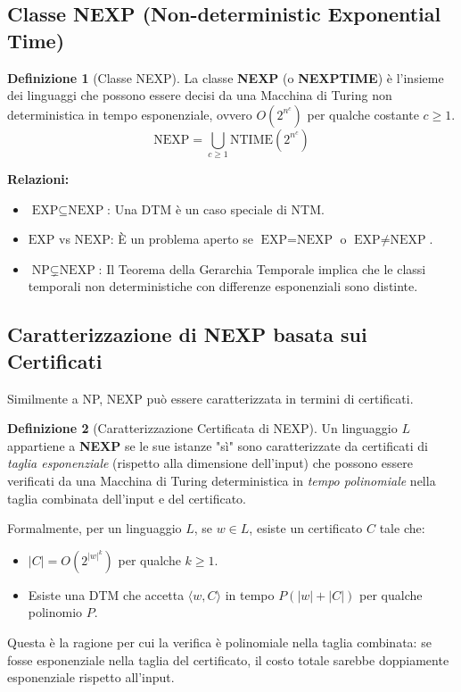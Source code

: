 \documentclass[a4paper]{article}
\theoremstyle{definition} %
\newtheorem{definition}{Definizione}
\begin{document}
\subsection{Classe NEXP (Non-deterministic Exponential Time)}
\begin{definition}[Classe NEXP]
La classe \textbf{NEXP} (o \textbf{NEXPTIME}) è l'insieme dei linguaggi che possono essere decisi da una Macchina di Turing non deterministica in tempo esponenziale, ovvero $O(2^{n^c})$ per qualche costante $c \ge 1$.
\[
\text{NEXP} = \bigcup_{c \ge 1} \text{NTIME}(2^{n^c})
\]
\end{definition}

\textbf{Relazioni:}
\begin{itemize}
    \item $\text{EXP} \subseteq \text{NEXP}$: Una DTM è un caso speciale di NTM.
    \item $\text{EXP}$ vs $\text{NEXP}$: È un problema aperto se $\text{EXP} = \text{NEXP}$ o $\text{EXP} \neq \text{NEXP}$.
    \item $\text{NP} \subsetneq \text{NEXP}$: Il Teorema della Gerarchia Temporale implica che le classi temporali non deterministiche con differenze esponenziali sono distinte.
\end{itemize}

\subsection{Caratterizzazione di NEXP basata sui Certificati}
Similmente a NP, NEXP può essere caratterizzata in termini di certificati.
\begin{definition}[Caratterizzazione Certificata di NEXP]
Un linguaggio $L$ appartiene a \textbf{NEXP} se le sue istanze "sì" sono caratterizzate da certificati di \textit{taglia esponenziale} (rispetto alla dimensione dell'input) che possono essere verificati da una Macchina di Turing deterministica in \textit{tempo polinomiale} nella taglia combinata dell'input e del certificato.
\end{definition}
Formalmente, per un linguaggio $L$, se $w \in L$, esiste un certificato $C$ tale che:
\begin{itemize}
    \item $|C| = O(2^{|w|^k})$ per qualche $k \ge 1$.
    \item Esiste una DTM che accetta $\langle w, C \rangle$ in tempo $P(|w| + |C|)$ per qualche polinomio $P$.
\end{itemize}
Questa è la ragione per cui la verifica è polinomiale nella taglia combinata: se fosse esponenziale nella taglia del certificato, il costo totale sarebbe doppiamente esponenziale rispetto all'input.
\end{document}
